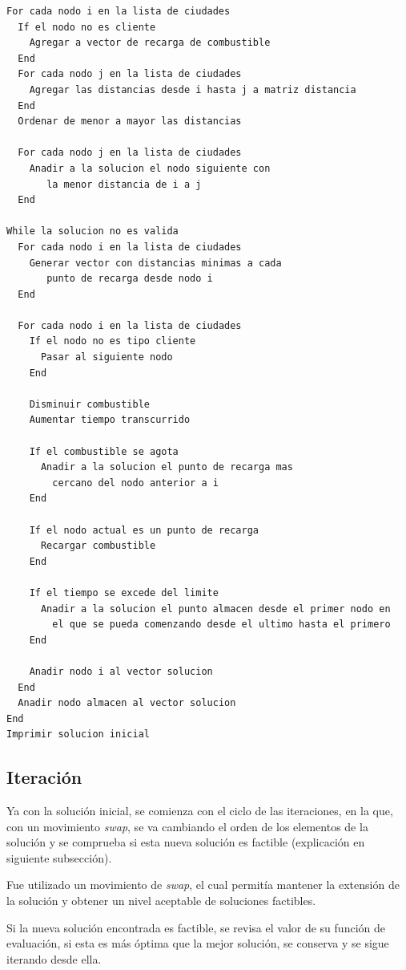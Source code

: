 \documentclass[letter, 10pt]{article}
\begin{document}
\begin{lstlisting}[frame = single]
For cada nodo i en la lista de ciudades
  If el nodo no es cliente
    Agregar a vector de recarga de combustible
  End
  For cada nodo j en la lista de ciudades
    Agregar las distancias desde i hasta j a matriz distancia
  End
  Ordenar de menor a mayor las distancias
  
  For cada nodo j en la lista de ciudades
    Anadir a la solucion el nodo siguiente con
       la menor distancia de i a j
  End

While la solucion no es valida
  For cada nodo i en la lista de ciudades
    Generar vector con distancias minimas a cada
       punto de recarga desde nodo i
  End
  
  For cada nodo i en la lista de ciudades
    If el nodo no es tipo cliente
      Pasar al siguiente nodo
    End

    Disminuir combustible
    Aumentar tiempo transcurrido
    
    If el combustible se agota
      Anadir a la solucion el punto de recarga mas
        cercano del nodo anterior a i
    End

    If el nodo actual es un punto de recarga
      Recargar combustible
    End

    If el tiempo se excede del limite
      Anadir a la solucion el punto almacen desde el primer nodo en 
        el que se pueda comenzando desde el ultimo hasta el primero
    End

    Anadir nodo i al vector solucion
  End
  Anadir nodo almacen al vector solucion
End
Imprimir solucion inicial
\end{lstlisting}

\subsection{Iteración}
Ya con la solución inicial, se comienza con el ciclo de las iteraciones, en la que, con un movimiento \textit{swap}, se va cambiando el orden de los elementos de la solución y se comprueba si esta nueva solución es factible (explicación en siguiente subsección).

Fue utilizado un movimiento de \textit{swap}, el cual permitía mantener la extensión de la solución y obtener un nivel aceptable de soluciones factibles.

Si la nueva solución encontrada es factible, se revisa el valor de su función de evaluación, si esta es más óptima que la mejor solución, se conserva y se sigue iterando desde ella.
\end{document}
